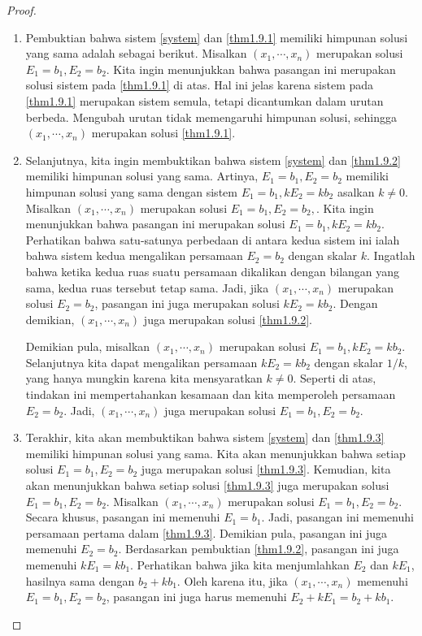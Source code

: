 \begin{proof} 
\begin{enumerate}
\item
Pembuktian bahwa sistem \ref{system} dan \ref{thm1.9.1} memiliki
himpunan solusi yang sama adalah sebagai berikut. Misalkan $\left( x_{1},\cdots
,x_{n}\right) $ merupakan solusi $E_{1}=b_{1},E_{2}=b_{2}$. Kita ingin
menunjukkan bahwa pasangan ini merupakan solusi sistem pada \ref{thm1.9.1} di atas.
Hal ini jelas karena sistem pada \ref{thm1.9.1} merupakan sistem semula,
tetapi dicantumkan dalam urutan berbeda. Mengubah urutan tidak
memengaruhi himpunan solusi, sehingga $\left( x_{1},\cdots ,x_{n}\right) $ merupakan
solusi \ref{thm1.9.1}.

\item
Selanjutnya, kita ingin membuktikan bahwa sistem \ref{system} dan \ref{thm1.9.2} memiliki
himpunan solusi yang sama. Artinya, $E_{1}=b_{1},E_{2}=b_{2}$ memiliki
himpunan solusi yang sama dengan sistem $E_{1}=b_{1},kE_{2}=kb_{2}$ asalkan $k\neq
0 $. Misalkan $\left( x_{1},\cdots ,x_{n}\right) $ merupakan
solusi $E_{1}=b_{1},E_{2}=b_{2},$. Kita ingin menunjukkan bahwa pasangan ini merupakan solusi $E_{1}=b_{1},kE_{2}=kb_{2}$.
Perhatikan bahwa satu-satunya perbedaan di antara kedua sistem ini ialah bahwa sistem kedua
mengalikan persamaan $E_{2}=b_{2}$ dengan skalar $k$. Ingatlah bahwa ketika kedua ruas suatu
persamaan dikalikan dengan bilangan yang sama, kedua ruas tersebut tetap sama. Jadi, jika $\left( x_{1},\cdots ,x_{n}\right) $
merupakan solusi $E_{2}=b_{2}$, pasangan ini juga merupakan solusi $kE_{2}=kb_{2}$. Dengan demikian, $\left( x_{1},\cdots ,x_{n}\right) $ juga
merupakan solusi \ref{thm1.9.2}.

Demikian pula, misalkan $\left( x_{1},\cdots
,x_{n}\right) $ merupakan solusi $E_{1}=b_{1},kE_{2}=kb_{2}$. Selanjutnya kita dapat
mengalikan persamaan $kE_{2}=kb_{2}$ dengan skalar $1/k$, yang hanya mungkin karena kita mensyaratkan $k\neq
0$. Seperti di atas, tindakan ini mempertahankan kesamaan dan kita memperoleh persamaan $E_{2} = b_{2}$.
Jadi, $\left( x_{1},\cdots ,x_{n}\right)$ juga merupakan solusi $E_{1}=b_{1},E_{2}=b_{2}.$

\item
Terakhir, kita akan membuktikan bahwa sistem \ref{system} dan
\ref{thm1.9.3} memiliki himpunan solusi yang sama. Kita akan menunjukkan bahwa setiap
solusi $E_{1}=b_{1},E_{2}=b_{2}$ juga merupakan solusi
\ref{thm1.9.3}. Kemudian, kita akan menunjukkan bahwa setiap solusi \ref{thm1.9.3}
juga merupakan solusi $E_{1}=b_{1},E_{2}=b_{2}$. Misalkan $\left(
x_{1},\cdots ,x_{n}\right) $ merupakan solusi
$E_{1}=b_{1},E_{2}=b_{2}$. Secara khusus, pasangan ini memenuhi $E_{1} =
b_{1}$. Jadi, pasangan ini memenuhi persamaan pertama dalam \ref{thm1.9.3}.
Demikian pula, pasangan ini juga memenuhi $E_{2} = b_{2}$. Berdasarkan pembuktian
\ref{thm1.9.2}, pasangan ini juga memenuhi $kE_{1}=kb_{1}$. Perhatikan bahwa jika kita menjumlahkan
$E_{2}$ dan $kE_{1}$, hasilnya sama dengan $b_{2} + kb_{1}$. Oleh karena itu, jika
$\left( x_{1},\cdots ,x_{n}\right) $ memenuhi $E_{1}=b_{1},E_{2}=b_{2}$,
pasangan ini juga harus memenuhi $E_{2}+kE_{1}=b_{2}+kb_{1}$.


\end{enumerate}
\end{proof}
